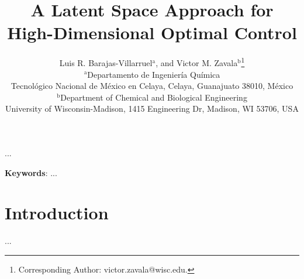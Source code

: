 \documentclass[11pt,twoside]{article}
\renewenvironment{abstract}{%
  \small
  \begin{center}%
    {\Large\bfseries \abstractname}%
  \end{center}%
  \quotation
}{%
  \endquotation
}
\numberwithin{equation}{section} %
\begin{document}
\title{\bfseries A Latent Space Approach for High-Dimensional Optimal Control}

\author{
  Luis R. Barajas-Villarruel$^\text{a}$, and Victor M. Zavala$^\text{b}$\thanks{Corresponding Author: victor.zavala@wisc.edu.}\\
  {\small $^\text{a}$Departamento de Ingeniería Química}\\
  {\small \;Tecnológico Nacional de México en Celaya, Celaya, Guanajuato 38010, México}\\
  {\small $^\text{b}$Department of Chemical and Biological Engineering}\\
  {\small \;University of Wisconsin-Madison, 1415 Engineering Dr, Madison, WI 53706, USA}
}
\date{}
\maketitle

\begin{abstract}
  ...
\end{abstract}

{\bf Keywords}: ...

\clearpage
\section{Introduction}
\citet{alanqar2015economic} ... \citet{schulze2022data}

\clearpage
\pagestyle{plain}
\thispagestyle{plain}


\end{document}
